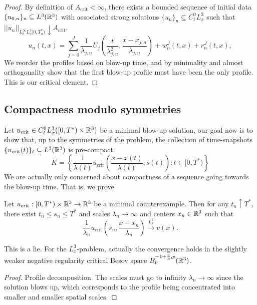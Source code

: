 \begin{proof}	
By definition of $A_{\mathrm{crit}} < \infty$, there exists a bounded sequence of initial data $\{u_{0, n}\}_n \subseteq L^3 (\mathbb R^3)$ with associated strong solutions $\{u_n\}_n \subseteq C_t^0 L^3_x$ such that $||u_n||_{L^\infty_t L^3_x [0, T^*_n)} \downarrow A_{\mathrm{crit}}$.
	\begin{equation}
		u_n (t, x)
			=  \sum_{j = 0}^J \frac{1}{\lambda_{j, n}} U_j \left( \frac{t}{\lambda_{j, n}^2} , \frac{x - x_{j, n}}{\lambda_{j, n}} \right) + w^J_n (t, x) + r^J_n (t, x),
	\end{equation}
	We reorder the profiles based on blow-up time, and by minimality and almost orthogonality show that the first blow-up profile must have been the only profile. This is our critical element.
\end{proof}

\subsection{Compactness modulo symmetries}

Let $u_{\mathrm{crit}} \in C^0_t L^3_x ([0, T^*) \times \mathbb R^3)$ be a minimal blow-up solution, our goal now is to show that, up to the symmetries of the problem, the collection of time-snapshots $\{ u_{\mathrm{crit}} (t)\}_t \subseteq L^3 (\mathbb R^3)$ is pre-compact. 
	\[
		K = \left\{ \frac{1}{\lambda (t)} u_{\mathrm{crit}} \left( \frac{x - x(t)}{\lambda(t)} , s(t) \right) : t \in [0, T^*) \right\}
	\]
We are actually only concerned about compactness of a sequence going towards the blow-up time. That is, we prove

\begin{proposition}
	Let $u_{\mathrm{crit}}: [0, T^*) \times \mathbb R^3 \to \mathbb R^3$ be a minimal counterexample. Then for any $t_n \uparrow T^*$, there exist $t_n \leq s_n \leq T^*$ and scales $\lambda_n \to \infty$ and centers $x_n \in \mathbb R^3$ such that 
		\[
			\frac{1}{\lambda_n} u_{\mathrm{crit}} \left( s_n, \frac{x - x_n}{\lambda_n} \right) \overset{L^3_x}{\longrightarrow} v(x). 
		\]
\end{proposition}

\begin{remark}
	This is a lie. For the $L^3_x$-problem, actually the convergence holds in the slightly weaker negative regularity critical Besov space $B^{-1 + \frac3p, p}_p (\mathbb R^3)$. 
\end{remark}

\begin{proof}
	Profile decomposition. The scales must go to infinity $\lambda_n \to \infty$ since the solution blows up, which corresponds to the profile being concentrated into smaller and smaller spatial scales. 
\end{proof}